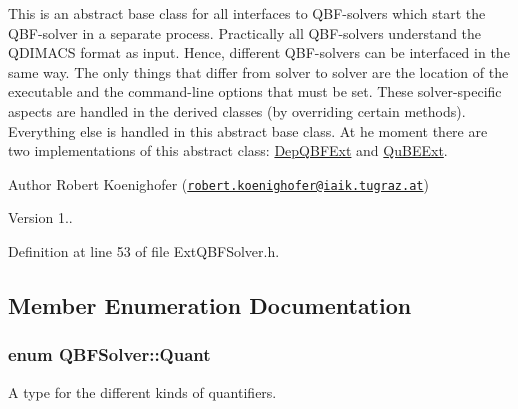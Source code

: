 This is an abstract base class for all interfaces to Q\-B\-F-\/solvers which start the Q\-B\-F-\/solver in a separate process. Practically all Q\-B\-F-\/solvers understand the Q\-D\-I\-M\-A\-C\-S format as input. Hence, different Q\-B\-F-\/solvers can be interfaced in the same way. The only things that differ from solver to solver are the location of the executable and the command-\/line options that must be set. These solver-\/specific aspects are handled in the derived classes (by overriding certain methods). Everything else is handled in this abstract base class. At he moment there are two implementations of this abstract class\-: \hyperlink{classDepQBFExt}{Dep\-Q\-B\-F\-Ext} and \hyperlink{classQuBEExt}{Qu\-B\-E\-Ext}.

\begin{DoxyAuthor}{Author}
Robert Koenighofer (\href{mailto:robert.koenighofer@iaik.tugraz.at}{\tt robert.\-koenighofer@iaik.\-tugraz.\-at}) 
\end{DoxyAuthor}
\begin{DoxyVersion}{Version}
1.. 
\end{DoxyVersion}


Definition at line 53 of file Ext\-Q\-B\-F\-Solver.\-h.



\subsection{Member Enumeration Documentation}
\hypertarget{classQBFSolver_ac091e263cb55286cc07b2451bcf4d3c7}{
\subsubsection[{Quant}]{\setlength{\rightskip}{0pt plus 5cm}enum {\bf Q\-B\-F\-Solver\-::\-Quant}\hspace{0.3cm}{\ttfamily [inherited]}}}\label{classQBFSolver_ac091e263cb55286cc07b2451bcf4d3c7}


A type for the different kinds of quantifiers. 

